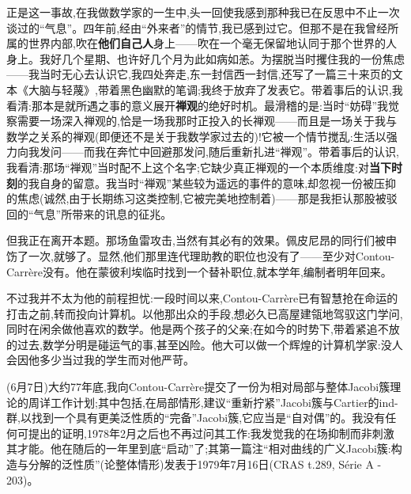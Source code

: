正是这一事故,在我做数学家的一生中,头一回使我感到那种我已在反思中不止一次谈过的“气息”。四年前,经由“外来者”的情节,我已感到过它。但那不是在我曾经所属的世界内部,吹在\textbf{他们自己人}身上——吹在一个毫无保留地认同于那个世界的人身上。我好几个星期、也许好几个月为此如病如恙。为摆脱当时攫住我的一份焦虑——我当时无心去认识它,我四处奔走,东一封信西一封信,还写了一篇三十来页的文本《大脑与轻蔑》,带着黑色幽默的笔调;我终于放弃了发表它。带着事后的认识,我看清:那本是就所遇之事的意义展开\textbf{禅观}的绝好时机。最滑稽的是:当时“妨碍”我觉察需要一场深入禅观的,恰是一场我那时正投入的长禅观——而且是一场关于我与数学之关系的禅观(即便还不是关于我数学家过去的)!它被一个情节搅乱:生活以强力向我发问——而我在奔忙中回避那发问,随后重新扎进“禅观”。带着事后的认识,我看清:那场“禅观”当时配不上这个名字;它缺少真正禅观的一个本质维度:对\textbf{当下时刻}的我自身的留意。我当时“禅观”某些较为遥远的事件的意味,却忽视一份被压抑的焦虑(诚然,由于长期练习这类控制,它被完美地控制着)——那是我拒认那股被驳回的“气息”所带来的讯息的征兆。

但我正在离开本题。那场鱼雷攻击,当然有其必有的效果。佩皮尼昂的同行们被申饬了一次,就够了。显然,他们那里连代理助教的职位也没有了——至少对Contou-Carrère没有。他在蒙彼利埃临时找到一个替补职位,就本学年,编制者明年回来。

不过我并不太为他的前程担忧:一段时间以来,Contou-Carrère已有智慧抢在命运的打击之前,转而投向计算机。以他那出众的手段,想必久已高屋建瓴地驾驭这门学问,同时在闲余做他喜欢的数学。他是两个孩子的父亲;在如今的时势下,带着紧追不放的过去,数学分明是碰运气的事,甚至凶险。他大可以做一个辉煌的计算机学家:没人会因他多少当过我的学生而对他严苛。


(6月7日)大约77年底,我向Contou-Carrère提交了一份为相对局部与整体Jacobi簇理论的周详工作计划;其中包括,在局部情形,建议“重新拧紧”Jacobi簇与Cartier的ind-群,以找到一个具有更美泛性质的“完备”Jacobi簇,它应当是“自对偶”的。我没有任何可提出的证明,1978年2月之后也不再过问其工作:我发觉我的在场抑制而非刺激其才能。他在随后的一年里到底“启动”了;其第一篇注“相对曲线的广义Jacobi簇:构造与分解的泛性质”(论整体情形)发表于1979年7月16日(CRAS t.289, Série A - 203)。

